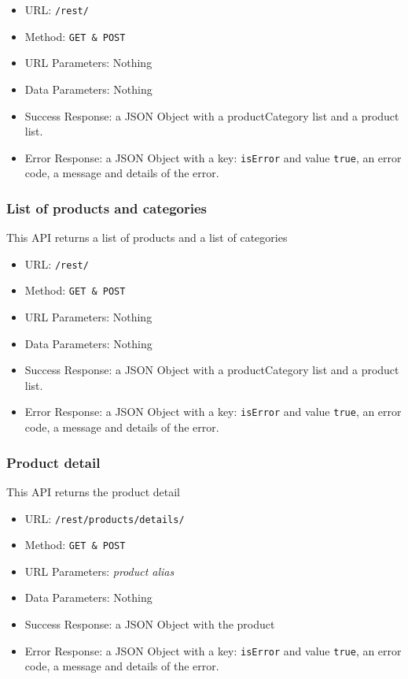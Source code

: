 \begin{itemize}
    \item URL: \texttt{/rest/}
    \item Method: \texttt{GET \& POST}
    \item URL Parameters: Nothing
    \item Data Parameters: Nothing
    \item Success Response: a JSON Object with a productCategory list and a product list.
    \item Error Response: a JSON Object with a key: \texttt{isError}  and value \texttt{true}, an error code, a message and details of the error.

\end{itemize}

\subsubsection*{List of products and categories}

This API returns a list of products and a list of categories

\begin{itemize}
    \item URL: \texttt{/rest/}
    \item Method: \texttt{GET \& POST}
    \item URL Parameters: Nothing
    \item Data Parameters: Nothing
    \item Success Response: a JSON Object with a productCategory list and a product list.
    \item Error Response: a JSON Object with a key: \texttt{isError}  and value \texttt{true}, an error code, a message and details of the error.
    
\end{itemize}

\subsubsection*{Product detail}

This API returns the product detail

\begin{itemize}
    \item URL: \texttt{/rest/products/details/}
    \item Method: \texttt{GET \& POST}
    \item URL Parameters: \textit{product alias}
    \item Data Parameters: Nothing
    \item Success Response: a JSON Object with the product
    \item Error Response: a JSON Object with a key: \texttt{isError}  and value \texttt{true}, an error code, a message and details of the error.
\end{itemize}

